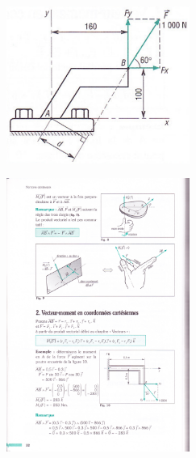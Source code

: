 \documentclass[10pt]{article}
\begin{document}
\begin{minipage}[c]{.45\linewidth}
\begin{center}
\includegraphics[width=6cm]{images/moment1.pdf}
\end{center}
\end{minipage} \hfill
\begin{minipage}[c]{.45\linewidth}
\begin{center}
\includegraphics[width=6cm]{images/moment3.pdf}
\end{center}
\end{minipage} 
\end{document}

